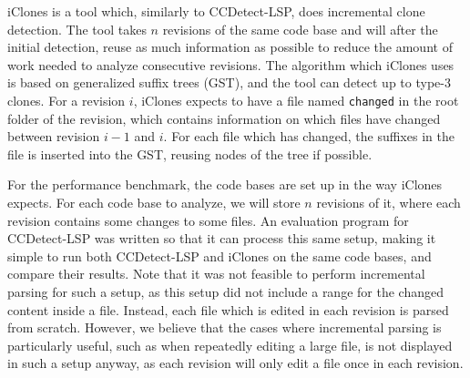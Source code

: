 iClones is a tool which, similarly to CCDetect-LSP, does incremental clone detection. The
tool takes $n$ revisions of the same code base and will after the initial detection, reuse
as much information as possible to reduce the amount of work needed to analyze consecutive
revisions. The algorithm which iClones uses is based on generalized suffix trees (GST),
and the tool can detect up to type-3 clones. For a revision $i$, iClones expects to have a
file named \verb|changed| in the root folder of the revision, which contains information
on which files have changed between revision $i - 1$ and $i$. For each file which has
changed, the suffixes in the file is inserted into the GST, reusing nodes of the tree if
possible.

For the performance benchmark, the code bases are set up in the way iClones expects. For
each code base to analyze, we will store $n$ revisions of it, where each revision contains
some changes to some files. An evaluation program for CCDetect-LSP was written so that it
can process this same setup, making it simple to run both CCDetect-LSP and iClones on the
same code bases, and compare their results. Note that it was not feasible to perform
incremental parsing for such a setup, as this setup did not include a range for the
changed content inside a file. Instead, each file which is edited in each revision is
parsed from scratch. However, we believe that the cases where incremental parsing is
particularly useful, such as when repeatedly editing a large file, is not displayed in
such a setup anyway, as each revision will only edit a file once in each revision.

